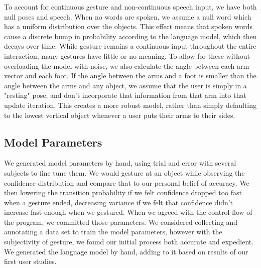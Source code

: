 \documentclass[letterpaper, 10 pt, conference]{ieeeconf}
\begin{document}
To account for continuous gesture and non-continuous speech input, we have both null poses and speech.
When no words are spoken, we assume a null word which has a uniform
distribution over the objects.  This effect means that spoken words
cause a discrete bump in probability according to the language model,
which then decays over time. While gesture remains a continuous input throughout the entire interaction, many gestures have little or no meaning. To allow for these without overloading the model with noise, we also calculate the angle between each arm vector and each foot. If the angle between the arms and a foot is smaller than the angle between the arms and any object, we assume that the user is simply in a  "resting" pose, and don't incorporate that information from that arm into that update iteration. This creates a more robust model, rather than simply defaulting to the lowest vertical object whenever a user puts their arms to their sides.

\subsection{Model Parameters}
We generated model parameters by hand, using trial and error with several subjects to fine tune them. 
We would gesture at an object while observing the confidence distribution and compare that to our personal belief of accuracy. We then lowering the transition probability if we felt confidence dropped too fast when a gesture ended, decreasing variance if we felt that  confidence didn't increase fast enough when we gestured. When we agreed with the control flow of the program, we committed those parameters. We considered collecting and annotating a data set to train the model parameters, however with the subjectivity of gesture, we found our initial process both accurate and expedient. We generated the language model by hand, adding to it based on results of our first user studies.
\end{document}
